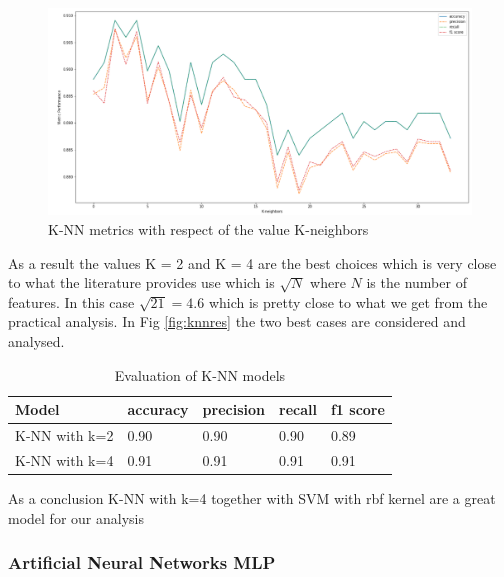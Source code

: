 \documentclass[a4paper,12pt]{article}
\begin{document}
\begin{figure}[H]
  \begin{center}
  \includegraphics[width=1.0\textwidth]{images/knn.png}
  \end{center}
  \caption{K-NN metrics with respect of the value K-neighbors}
  \label{fig:knn}
\end{figure}

\noindent As a result the values K = 2 and K = 4 are the best choices which is very close to what the literature provides use which is $\sqrt{N}$ where $N$ is the number of features. In this case $\sqrt{21} = 4.6$ which is pretty close to what we get from the practical analysis. In Fig \ref{fig:knnres} the two best cases are considered and analysed.

\begin{table}[H]
\begin{tabular}{ |p{6cm}||p{2cm}|p{2cm}|p{2cm}|p{2cm}| }
  \hline
  Model& accuracy & precision  &  recall & f1 score \\
  \hline
  K-NN with k=2 &          0.90&   0.90&  0.90&  0.89\\
  K-NN with k=4   &          0.91&   0.91&  0.91&  0.91\\
  \hline
\end{tabular}
\caption{Evaluation of K-NN models}
\label{tab:knnres}
\end{table}

\noindent As a conclusion K-NN with k=4 together with SVM with rbf kernel are a great model for our analysis

\subsubsection{Artificial Neural Networks MLP}
\end{document}
